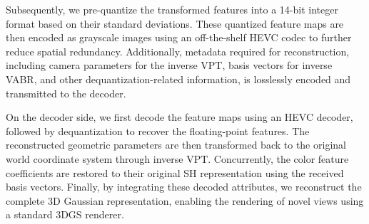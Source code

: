 \documentclass[lettersize,journal]{IEEEtran}
\begin{document}

Subsequently, we pre-quantize the transformed features into a 14-bit integer format based on their standard deviations. These quantized feature maps are then encoded as grayscale images using an off-the-shelf HEVC codec to further reduce spatial redundancy. Additionally, metadata required for reconstruction, including camera parameters for the inverse VPT, basis vectors for inverse VABR, and other dequantization-related information, is losslessly encoded and transmitted to the decoder.

On the decoder side, we first decode the feature maps using an HEVC decoder, followed by dequantization to recover the floating-point features. The reconstructed geometric parameters are then transformed back to the original world coordinate system through inverse VPT. Concurrently, the color feature coefficients are restored to their original SH representation using the received basis vectors. Finally, by integrating these decoded attributes, we reconstruct the complete 3D Gaussian representation, enabling the rendering of novel views using a standard 3DGS renderer.
\end{document}
